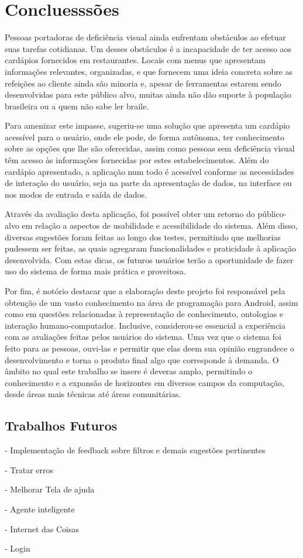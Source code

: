\chapter{\label{chap:conclu}Concluesssões}

Pessoas portadoras de deficiência visual ainda enfrentam obstáculos ao efetuar suas tarefas cotidianas. Um desses obstáculos é a incapacidade de ter acesso aos cardápios fornecidos em restaurantes. Locais com menus que apresentam informações relevantes, organizadas, e que fornecem uma ideia concreta sobre as refeições ao cliente ainda são minoria e, apesar de ferramentas estarem sendo desenvolvidas para este público alvo, muitas ainda não dão suporte à população brasileira ou a quem não sabe ler braile.

Para amenizar este impasse, sugeriu-se uma solução que apresenta um cardápio acessível para o usuário, onde ele pode, de forma autônoma, ter conhecimento sobre as opções que lhe são oferecidas, assim como pessoas sem deficiência visual têm acesso às informações fornecidas por estes estabelecimentos. Além do cardápio apresentado, a aplicação num todo é acessível conforme as necessidades de interação do usuário, seja na parte da apresentação de dados, na interface ou nos modos de entrada e saída de dados.

\color{blue}
Através da avaliação desta aplicação, foi possível obter um retorno do público-alvo em relação a aspectos de usabilidade e acessibilidade do sistema. Além disso, diversas sugestões foram feitas ao longo dos testes, permitindo que melhorias pudessem ser feitas, as quais agregaram funcionalidades e praticidade à aplicação desenvolvida. Com estas dicas, os futuros usuários terão a oportunidade de fazer uso do sistema de forma mais prática e proveitosa.

Por fim, é notório destacar que a elaboração deste projeto foi responsável pela obtenção de um vasto conhecimento na área de programação para Android, assim como em questões relacionadas à representação de conhecimento, ontologias e interação humano-computador. Inclusive, considerou-se essencial a experiência com as avaliações feitas pelos usuários do sistema. Uma vez que o sistema foi feito para as pessoas, ouvi-las e permitir que elas deem sua opinião engrandece o desenvolvimento e torna o produto final algo que corresponde à demanda. O âmbito no qual este trabalho se insere é deveras amplo, permitindo o conhecimento e a expansão de horizontes em diversos campos da computação, desde áreas mais técnicas até áreas comunitárias. 
\color{black}
\section{Trabalhos Futuros}

- Implementação de feedback sobre filtros e demais sugestões pertinentes

- Tratar erros

- Melhorar Tela de ajuda

- Agente inteligente

- Internet das Coisas

- Login